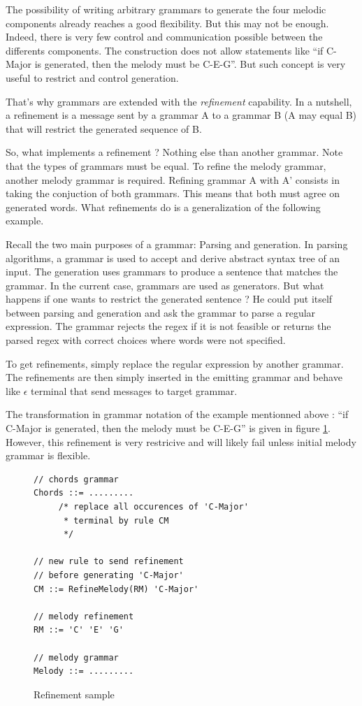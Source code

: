 \documentclass[twocolumn, 11pt]{article}
\begin{document}
The possibility of writing arbitrary grammars to generate the four melodic components already reaches a good flexibility. But this may not be enough. Indeed, there is very few control and communication possible between the differents components. The construction does not allow statements like ``if C-Major is generated, then the melody must be C-E-G''. But such concept is very useful to restrict and control generation.

That's why grammars are extended with the \emph{refinement} capability.
In a nutshell, a refinement is a message sent by a grammar A to a grammar B (A may equal B) that will restrict the generated sequence of B.

So, what implements a refinement ? Nothing else than another grammar. Note that the types of grammars must be equal. To refine the melody grammar, another melody grammar is required. Refining grammar A with A' consists in taking the conjuction of both grammars. This means that both must agree on generated words. What refinements do is a generalization of the following example.

Recall the two main purposes of a grammar: Parsing and generation. In parsing algorithms, a grammar is used to accept and derive abstract syntax tree of an input. The generation uses grammars to produce a sentence that matches the grammar.
In the current case, grammars are used as generators. But what happens if one wants to restrict the generated sentence ? He could put itself between parsing and generation and ask the grammar to parse a regular expression. The grammar rejects the regex if it is not feasible or returns the parsed regex with correct choices where words were not specified.

To get refinements, simply replace the regular expression by another grammar. The refinements are then simply inserted in the emitting grammar and behave like $\epsilon$ terminal that send messages to target grammar.

The transformation in grammar notation of the example mentionned above : ``if C-Major is generated, then the melody must be C-E-G'' is given in figure \ref{fig:refSam}. However, this refinement is very restricive and will likely fail unless initial melody grammar is flexible.

\begin{figure}[h]
  \centering
  \begin{lstlisting}
// chords grammar
Chords ::= .........
     /* replace all occurences of 'C-Major'
      * terminal by rule CM
      */ 

// new rule to send refinement
// before generating 'C-Major'
CM ::= RefineMelody(RM) 'C-Major'

// melody refinement
RM ::= 'C' 'E' 'G'

// melody grammar
Melody ::= .........

  \end{lstlisting}
  \caption{Refinement sample}
  \label{fig:refSam}
\end{figure}
\end{document}
